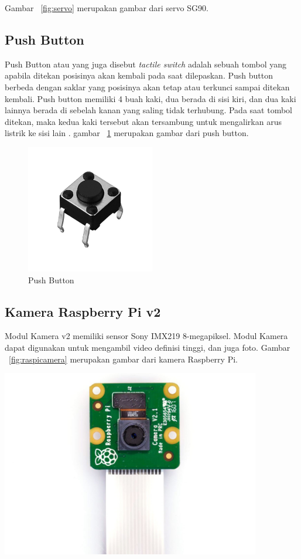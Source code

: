 Gambar ~\ref{fig:servo} merupakan gambar dari servo SG90.

\subsection{Push Button}
Push Button atau yang juga disebut \textit{tactile switch} adalah sebuah tombol yang apabila ditekan posisinya akan kembali pada saat dilepaskan. Push button berbeda dengan saklar yang posisinya akan tetap atau terkunci sampai ditekan kembali. Push button memiliki 4 buah kaki, dua berada di sisi kiri, dan dua kaki lainnya berada di sebelah kanan yang saling tidak terhubung. Pada saat tombol ditekan, maka kedua kaki tersebut akan tersambung untuk mengalirkan arus listrik ke sisi lain . gambar ~\ref{fig:pushbutton} merupakan gambar dari push button.

\begin{figure} [H]
    \includegraphics[width=0.50\textwidth, center]{images/pushbutton.jpg}
    \caption{Push Button}
    \label{fig:pushbutton}
\end{figure}

\subsection{Kamera Raspberry Pi v2}
Modul Kamera v2 memiliki sensor Sony IMX219 8-megapiksel. Modul Kamera dapat digunakan untuk mengambil video definisi tinggi, dan juga foto. Gambar ~\ref{fig:raspicamera} merupakan gambar dari kamera Raspberry Pi.

\begin{afigure} 
    \includegraphics[width=0.85\textwidth, center]{images/raspicamera.jpg}
    \caption{ Kamera Raspberry Pi}
    \label{fig:raspicamera}
\end{afigure}



